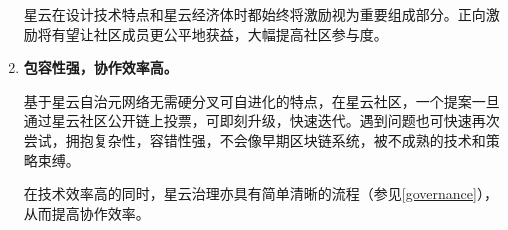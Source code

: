 \begin{enumerate}
	星云在设计技术特点和星云经济体时都始终将激励视为重要组成部分。正向激励将有望让社区成员更公平地获益，大幅提高社区参与度。
	
	\item 

	\textbf{包容性强，协作效率高。}
	
	基于星云自治元网络无需硬分叉可自进化的特点，在星云社区，一个提案一旦通过星云社区公开链上投票，可即刻升级，快速迭代。遇到问题也可快速再次尝试，拥抱复杂性，容错性强，不会像早期区块链系统，被不成熟的技术和策略束缚。

	在技术效率高的同时，星云治理亦具有简单清晰的流程（参见\ref{governance}），从而提高协作效率。

\end{enumerate}